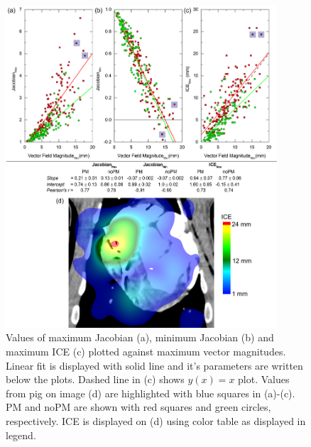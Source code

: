 
\begin{figure}[H]
	\begin{center}		
		\includegraphics[width=0.9\textwidth]{./VisualMotionManagment/Images/MaxVfdata_pigs.png}
		\caption{Values of maximum Jacobian (a), minimum Jacobian (b) and maximum ICE (c) plotted against maximum vector magnitudes. Linear fit is displayed with solid line and it's parameters are written below the plots. Dashed line in (c) shows $y(x)= x$ plot. Values from pig on image (d) are highlighted with blue squares in (a)-(c). PM and noPM are shown with red squares and green circles, respectively.
			ICE is displayed on (d) using color table as displayed in legend.}
		\label{maxvf_pigs}
	\end{center}
\end{figure}

